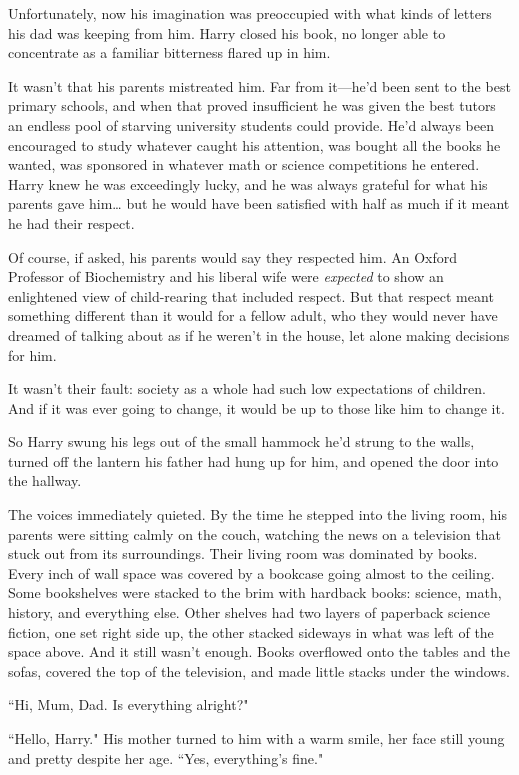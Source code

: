 Unfortunately, now his imagination was preoccupied with what kinds of letters his dad was keeping from him. Harry closed his book, no longer able to concentrate as a familiar bitterness flared up in him.

It wasn't that his parents mistreated him. Far from it---he'd been sent to the best primary schools, and when that proved insufficient he was given the best tutors an endless pool of starving university students could provide. He'd always been encouraged to study whatever caught his attention, was bought all the books he wanted, was sponsored in whatever math or science competitions he entered. Harry knew he was exceedingly lucky, and he was always grateful for what his parents gave him{\ldots} but he would have been satisfied with half as much if it meant he had their respect.

Of course, if asked, his parents would say they respected him. An Oxford Professor of Biochemistry and his liberal wife were \emph{expected} to show an enlightened view of child-rearing that included respect. But that respect meant something different than it would for a fellow adult, who they would never have dreamed of talking about as if he weren't in the house, let alone making decisions for him.

It wasn't their fault: society as a whole had such low expectations of children. And if it was ever going to change, it would be up to those like him to change it.

So Harry swung his legs out of the small hammock he'd strung to the walls, turned off the lantern his father had hung up for him, and opened the door into the hallway.

The voices immediately quieted. By the time he stepped into the living room, his parents were sitting calmly on the couch, watching the news on a television that stuck out from its surroundings. Their living room was dominated by books. Every inch of wall space was covered by a bookcase going almost to the ceiling. Some bookshelves were stacked to the brim with hardback books: science, math, history, and everything else. Other shelves had two layers of paperback science fiction, one set right side up, the other stacked sideways in what was left of the space above. And it still wasn't enough. Books overflowed onto the tables and the sofas, covered the top of the television, and made little stacks under the windows.

``Hi, Mum, Dad. Is everything alright?"

``Hello, Harry." His mother turned to him with a warm smile, her face still young and pretty despite her age. ``Yes, everything's fine."

